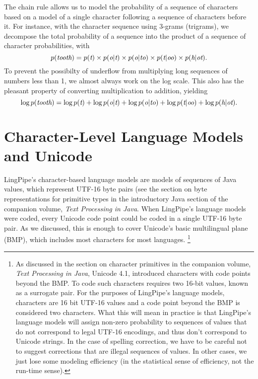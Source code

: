 The chain rule allows us to model the probability of a sequence of
characters based on a model of a single character following a sequence
of characters before it.  For instance, with the character sequence
 using 3-grams (trigrams), we decompose the
total probability of a sequence into the product of a sequence of
character probabilities, with
%
\begin{equation}
p(\mbox{\it tooth})
= p(\mbox{\it t})
\times
p(\mbox{\it o}|\mbox{\it t})
\times
p(\mbox{\it o}|\mbox{\it to})
\times
p(\mbox{\it t}|\mbox{\it oo})
\times
p(\mbox{\it h}|\mbox{\it ot}).
\end{equation}
%
To prevent the possibilty of underflow from multiplying long sequences
of numbers less than 1, we almost always work on the log scale.  This
also has the pleasant property of converting multiplication to
addition, yielding
%
\begin{equation}
\log p(\mbox{\it tooth})
= \log p(\mbox{\it t})
+
\log p(\mbox{\it o}|\mbox{\it t})
+ 
\log p(\mbox{\it o}|\mbox{\it to})
+
\log p(\mbox{\it t}|\mbox{\it oo})
+ 
\log p(\mbox{\it h}|\mbox{\it ot}).\label{eq:char-lm-log-scale}
\end{equation}


\section{Character-Level Language Models and Unicode}

LingPipe's character-based language models are models of sequences of
Java  values, which represent UTF-16 byte pairs (see the
section on byte representations for primitive types in the
introductory Java section of the companion volume, {\it Text
  Processing in Java}.  When LingPipe's language models were coded,
every Unicode code point could be coded in a single UTF-16 byte pair.
As we discussed, this is enough to cover Unicode's basic multilingual
plane (BMP), which includes most characters for most languages.%
%
\footnote{As discussed in the section on character primitives in the
  companion volume, {\it Text Processing in Java}, Unicode 4.1,
  introduced characters with code points beyond the BMP.  To code such
  characters requires two 16-bit  values, known as a
  surrogate pair.  For the purposes of LingPipe's language models,
  characters are 16 bit UTF-16 values and a code point beyond the BMP
  is considered two characters.  What this will mean in practice is
  that LingPipe's language models will assign non-zero probability to
  sequences of  values that do not correspond to legal
  UTF-16 encodings, and thus don't correspond to Unicode strings.  In
  the case of spelling correction, we have to be careful not to
  suggest corrections that are illegal sequences of 
  values.  In other cases, we just lose some modeling efficiency (in
  the statistical sense of efficiency, not the run-time sense).}


